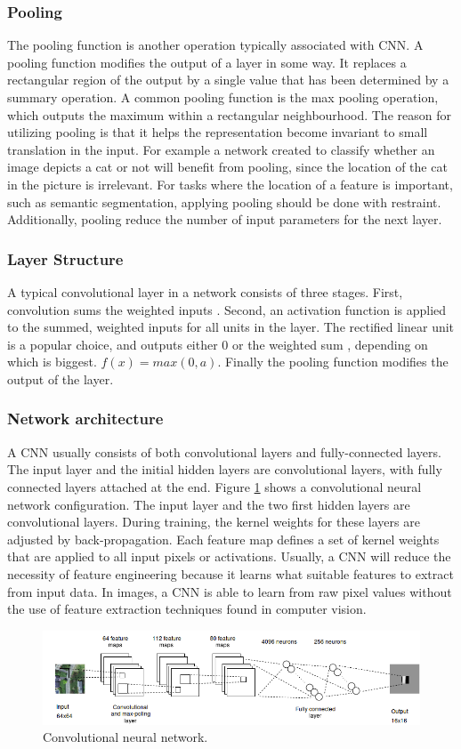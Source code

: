 \subsubsection{Pooling}
The pooling function is another operation typically associated with \ac{CNN}. A pooling function modifies the output of a layer in some way. It replaces a rectangular region of the output by a single value that has been determined by a summary operation. A common pooling function is the max pooling operation, which outputs the maximum within a rectangular neighbourhood. The reason for utilizing pooling is that it helps the representation become invariant to small translation in the input. For example a network created to classify whether an image depicts a cat or not will benefit from pooling, since the location of the cat in the picture is irrelevant. For tasks where the location of a feature is important, such as semantic segmentation, applying pooling should be done with restraint. Additionally, pooling reduce the number of input parameters for the next layer.

\subsubsection{Layer Structure}
A typical convolutional layer in a network consists of three stages. First, convolution sums the weighted inputs . Second, an activation function is applied to the summed, weighted inputs  for all units in the layer. The rectified linear unit is a popular choice, and outputs either 0 or the weighted sum , depending on which is biggest. $f(x) = max(0, a)$. Finally the pooling function modifies the output of the layer. 

\subsubsection{Network architecture}
A \ac{CNN} usually consists of both convolutional layers and fully-connected layers. The input layer and the initial hidden layers are convolutional layers, with fully connected layers attached at the end. Figure \ref{fig:conv} shows a convolutional neural network configuration. The input layer and the two first hidden layers are convolutional layers. During training, the kernel weights for these layers are adjusted by back-propagation. Each feature map defines a set of kernel weights that are applied to all input pixels or activations. Usually, a \ac{CNN} will reduce the necessity of feature engineering because it learns what suitable features to extract from input data. In images, a \ac{CNN} is able to learn from raw pixel values without the use of feature extraction techniques found in computer vision.


\begin{figure}[t]
\begin{center}
\includegraphics[width=1\columnwidth]{figs/conv_diagram.png}
\caption[Convolutional neural network]{Convolutional neural network. }
\label{fig:conv}
\end{center}
\end{figure}